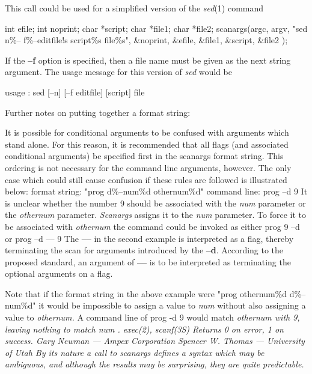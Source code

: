 This call could be used for a simplified version of the
{\it sed}{\rm (1)}
command
\par
int efile; int noprint; char *script; 
\nwl
char *file1; char *file2;
\nwl
scanargs(argc, argv, 
\ind{15.0em}
"sed n\%-- f\%--editfile!s script\%s file\%s",
\ind{15.0em}
\&noprint, \&efile, \&file1, \&script, \&file2 );
\par
If the
{\bf --f}
option is specified, then a file name must be given as the next string
argument.
The usage message for this version of
{\it sed}
would be
\par
usage : sed [--n] [--f editfile] [script] file

\par
Further notes on putting together a format string:
\par
It is possible for conditional arguments to be confused with
arguments which stand alone.  For this reason, it is recommended that
all flags (and associated conditional arguments) be specified first in
the scanargs format string.  This ordering is not necessary for the
command line arguments, however.  The only case which could still cause
confusion if these rules are followed is illustrated below:
\nwl
{}
format string:	"prog d\%--num\%d othernum\%d"
\nwl
command line:	prog --d 9
\nwl
It is unclear whether the number 9 should be associated with the 
{\it num}
parameter or the
{\it othernum}
parameter.  
{\it Scanargs} 
assigns it to the
{\it num}
parameter.  To force it to be associated with
{\it othernum}
the
command could be invoked as either
\nwl
{}
		prog 9 --d
\nwl
or		prog --d --\/-- 9
\nwl
The 
{\bf --\/--}
in the second example is interpreted as a flag, thereby
terminating the scan for arguments introduced by the 
{\bf --d}{\rm .}
According to the proposed standard, an argument of
{\bf --\/--}
is to be interpreted as terminating the optional arguments on a flag.
\par
Note that if the format string in the above example were
\nwl
{}
		"prog othernum\%d d\%--num\%d"
\nwl
it would be impossible to assign a value to 
{\it num}
without also
assigning a value to 
{\it othernum.}
A command line of
	prog -d 9
would match %
\it othernum \rm%
with 9, leaving nothing to match %
\it num\rm%
.
exec(2), scanf(3S)
Returns 0 on error, 1 on success.
Gary Newman --- Ampex Corporation
\nwl
Spencer W. Thomas --- University of Utah
By its nature a call to scanargs defines a syntax
which may be ambiguous, and although the results may be surprising, 
they are quite predictable.

